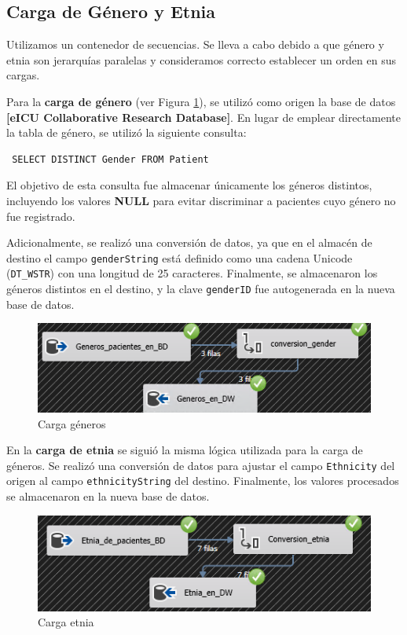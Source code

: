 \documentclass[12pt, a4paper, twoside]{article}
\begin{document}
	
	\subsection{Carga de Género y Etnia}
	
	Utilizamos un contenedor de secuencias. Se lleva a cabo debido a que género y etnia son jerarquías paralelas y consideramos correcto establecer un orden en sus cargas.
	
	Para la \textbf{carga de género} (ver Figura \ref{fig:10}), se utilizó como origen la base de datos \textbf{[eICU Collaborative Research Database]}. En lugar de emplear directamente la tabla de género, se utilizó la siguiente consulta:
	
	\begin{verbatim} SELECT DISTINCT Gender FROM Patient \end{verbatim}
	
	El objetivo de esta consulta fue almacenar únicamente los géneros distintos, incluyendo los valores \textbf{NULL} para evitar discriminar a pacientes cuyo género no fue registrado.
	
	Adicionalmente, se realizó una conversión de datos, ya que en el almacén de destino el campo \texttt{genderString} está definido como una cadena Unicode (\texttt{DT\_WSTR}) con una longitud de 25 caracteres. Finalmente, se almacenaron los géneros distintos en el destino, y la clave \texttt{genderID} fue autogenerada en la nueva base de datos.
	
	\begin{figure}[h!]
		\centering
		\includegraphics[width=1\textwidth]{image/106_carga_generos.png}
		\caption{Carga géneros}
		\label{fig:10}
	\end{figure}
	
	En la \textbf{carga de etnia} se siguió la misma lógica utilizada para la carga de géneros. Se realizó una conversión de datos para ajustar el campo \texttt{Ethnicity} del origen al campo \texttt{ethnicityString} del destino. Finalmente, los valores procesados se almacenaron en la nueva base de datos.
	
	\begin{figure}[h!]
		\centering
		\includegraphics[width=1\textwidth]{image/107_carga_etnia.png}
		\caption{Carga etnia}
		\label{fig:11}
	\end{figure}
	
\end{document}
